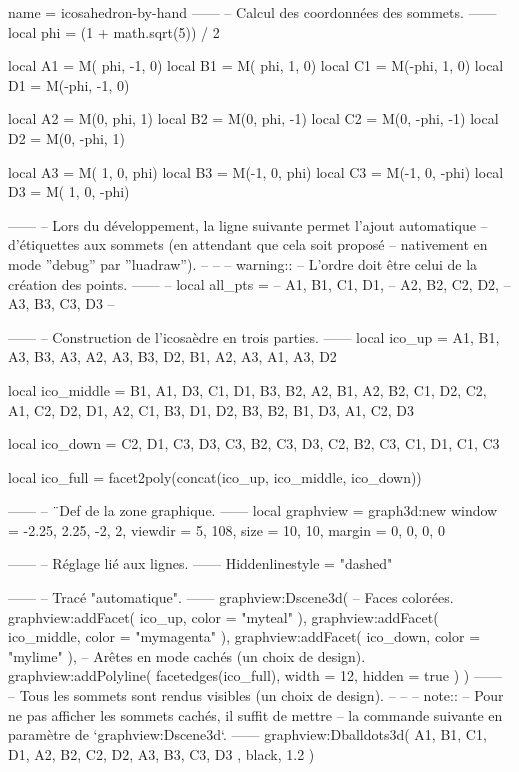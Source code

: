 \documentclass{standalone}
\begin{document}
\begin{luadraw}{name = icosahedron-by-hand}
------
-- Calcul des coordonnées des sommets.
------
local phi = (1 + math.sqrt(5)) / 2

local A1 = M( phi, -1, 0)
local B1 = M( phi,  1, 0)
local C1 = M(-phi,  1, 0)
local D1 = M(-phi, -1, 0)

local A2 = M(0,  phi,  1)
local B2 = M(0,  phi, -1)
local C2 = M(0, -phi, -1)
local D2 = M(0, -phi,  1)

local A3 = M( 1, 0,  phi)
local B3 = M(-1, 0,  phi)
local C3 = M(-1, 0, -phi)
local D3 = M( 1, 0, -phi)

------
-- Lors du développement, la ligne suivante permet l'ajout automatique
-- d'étiquettes aux sommets (en attendant que cela soit proposé
-- nativement en mode ''debug'' par ''luadraw'').
--
--
--  warning::
--      L'ordre doit être celui de la création des points.
------
-- local all_pts = {
--   A1, B1, C1, D1,
--   A2, B2, C2, D2,
--   A3, B3, C3, D3
-- }

------
-- Construction de l'icosaèdre en trois parties.
------
local ico_up = {
  {A1, B1, A3},
  {B3, A3, A2},
  {A3, B3, D2},
  {B1, A2, A3},
  {A1, A3, D2}
}

local ico_middle = {
  {B1, A1, D3},
  {C1, D1, B3},
  {B2, A2, B1},
  {A2, B2, C1},
  {D2, C2, A1},
  {C2, D2, D1},
  {A2, C1, B3},
  {D1, D2, B3},
  {B2, B1, D3},
  {A1, C2, D3}
}

local ico_down = {
  {C2, D1, C3},
  {D3, C3, B2},
  {C3, D3, C2},
  {B2, C3, C1},
  {D1, C1, C3}
}

local ico_full = facet2poly(concat(ico_up, ico_middle, ico_down))

------
-- ¨Def de la zone graphique.
------
local graphview = graph3d:new{
    window  = {-2.25, 2.25, -2, 2},
    viewdir = {5, 108},
    size    = {10, 10},
    margin  = {0, 0, 0, 0}
}

------
-- Réglage lié aux lignes.
------
Hiddenlinestyle = "dashed"

------
-- Tracé "automatique".
------
graphview:Dscene3d(
-- Faces colorées.
    graphview:addFacet(
      ico_up,
      {
        color = "myteal"
      }
    ),
    graphview:addFacet(
      ico_middle,
      {
        color = "mymagenta"
      }
    ),
    graphview:addFacet(
      ico_down,
      {
        color = "mylime"
      }
    ),
-- Arêtes en mode cachés (un choix de design).
    graphview:addPolyline(
      facetedges(ico_full),
      {
        width = 12,
        hidden = true
      }
    )
)
------
-- Tous les sommets sont rendus visibles (un choix de design).
--
--
-- note::
--     Pour ne pas afficher les sommets cachés, il suffit de mettre
--     la commande suivante en paramètre de `graphview:Dscene3d`.
------
graphview:Dballdots3d(
  {
    A1, B1, C1, D1,
    A2, B2, C2, D2,
    A3, B3, C3, D3
  },
  black,
  1.2
)


\end{luadraw}
\end{document}
